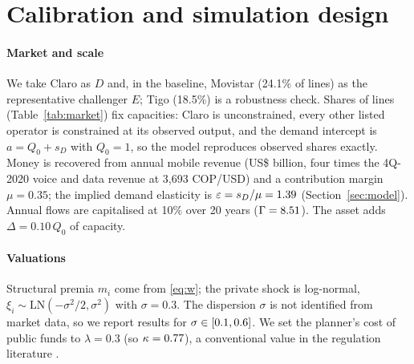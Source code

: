 \documentclass[12pt,a4paper]{article}
\theoremstyle{definition}
\theoremstyle{remark}
\newcommand{\us}{US\$}
\begin{document}
\section{Calibration and simulation design}\label{sec:calibration}

\paragraph{Market and scale} We take Claro as $D$ and, in the baseline, Movistar (24.1\% of lines) as the representative challenger $E$; Tigo (18.5\%) is a robustness check. Shares of lines (Table~\ref{tab:market}) fix capacities: Claro is unconstrained, every other listed operator is constrained at its observed output, and the demand intercept is $a=Q_0+s_D$ with $Q_0=1$, so the model reproduces observed shares exactly. Money is recovered from annual mobile revenue (\us\annualRevUSD{} billion, four times the 4Q-2020 voice and data revenue at 3{,}693 COP/USD) and a contribution margin $\mu=0.35$; the implied demand elasticity is $\varepsilon=s_D/\mu=1.39$ (Section~\ref{sec:model}). Annual flows are capitalised at 10\% over 20 years ($\Gamma=8.51$). The asset adds $\Delta=0.10\,Q_0$ of capacity.

\paragraph{Valuations} Structural premia $m_i$ come from \eqref{eq:w}; the private shock is log-normal, $\xi_i\sim\mathrm{LN}(-\sigma^2/2,\sigma^2)$ with $\sigma=0.3$. The dispersion $\sigma$ is not identified from market data, so we report results for $\sigma\in[0.1,0.6]$. We set the planner's cost of public funds to $\lambda=0.3$ (so $\kappa=0.77$), a conventional value in the regulation literature \citep{laffonttirole1993,laffont2005}.
\end{document}
